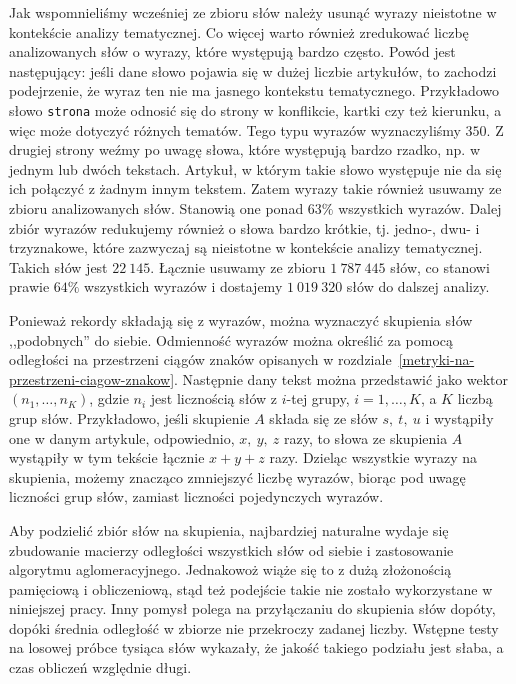 \documentclass{praca1}
\begin{document}
Jak wspomnieliśmy wcześniej ze zbioru słów należy usunąć wyrazy nieistotne w kontekście analizy tematycznej. Co więcej warto również zredukować liczbę analizowanych słów o wyrazy, które występują bardzo często. Powód jest następujący: jeśli dane słowo pojawia się w dużej liczbie artykułów, to zachodzi podejrzenie, że wyraz ten nie ma jasnego kontekstu tematycznego. Przykładowo słowo \verb|strona| może odnosić się do strony w konflikcie, kartki czy też kierunku, a więc może dotyczyć różnych tematów. Tego typu wyrazów wyznaczyliśmy $350$. Z drugiej strony weźmy po uwagę słowa, które występują bardzo rzadko, np. w jednym lub dwóch tekstach. Artykuł, w którym takie słowo występuje nie da się ich połączyć z żadnym innym tekstem. Zatem wyrazy takie również usuwamy ze zbioru analizowanych słów. Stanowią one ponad $63\%$ wszystkich wyrazów. Dalej zbiór wyrazów redukujemy również o słowa bardzo krótkie, tj. jedno-, dwu- i trzyznakowe, które zazwyczaj są nieistotne w kontekście analizy tematycznej. Takich słów jest $22\ 145$. Łącznie usuwamy ze zbioru $1\ 787\ 445$ słów, co stanowi prawie $64\%$ wszystkich wyrazów i dostajemy $1\ 019\ 320$ słów do dalszej analizy.

Ponieważ rekordy składają się z wyrazów, można wyznaczyć skupienia słów ,,podobnych'' do siebie. Odmienność wyrazów można określić za pomocą odległości na przestrzeni ciągów znaków opisanych w rozdziale~\ref{metryki-na-przestrzeni-ciagow-znakow}. Następnie dany tekst można przedstawić jako wektor $(n_1, \ldots, n_K)$, gdzie $n_i$ jest licznością słów z $i$-tej grupy, $i=1,\ldots,K$, a $K$ liczbą grup słów. Przykładowo, jeśli skupienie $A$ składa się ze słów $s,\ t,\ u$ i wystąpiły one w danym artykule, odpowiednio, $x,\ y,\ z$ razy, to słowa ze skupienia $A$ wystąpiły w tym tekście łącznie $x+y+z$ razy. Dzieląc wszystkie wyrazy na skupienia, możemy znacząco zmniejszyć liczbę wyrazów, biorąc pod uwagę liczności grup słów, zamiast liczności pojedynczych wyrazów.

Aby podzielić zbiór słów na skupienia, najbardziej naturalne wydaje się zbudowanie macierzy odległości wszystkich słów od siebie i zastosowanie algorytmu aglomeracyjnego. Jednakowoż wiąże się to z dużą złożonością pamięciową i obliczeniową, stąd też podejście takie nie zostało wykorzystane w niniejszej pracy. Inny pomysł polega na przyłączaniu do skupienia słów dopóty, dopóki średnia odległość w zbiorze nie przekroczy zadanej liczby. Wstępne testy na losowej próbce tysiąca słów wykazały, że jakość takiego podziału jest słaba, a czas obliczeń względnie długi.
\end{document}

